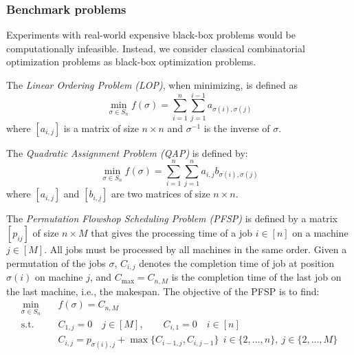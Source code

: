 \documentclass[sigconf,dvipsnames]{acmart}
\begin{document}
\subsubsection{Benchmark problems}
%
Experiments with real-world expensive black-box problems would be computationally infeasible. Instead, we consider classical combinatorial optimization problems as black-box optimization problems. 

The \emph{Linear Ordering Problem (LOP)}, when minimizing, is defined as
\begin{equation}\label{eq:lop}
  \min_{\sigma \in S_n} f(\sigma) = \sum_{i=1}^{n} \sum_{j=1}^{i-1}  a_{\sigma(i), \sigma(j)}
\end{equation}
where $[a_{i,j}]$ is a matrix of size $n \times n$ and $\sigma^{-1}$ is the inverse of $\sigma$.


The \emph{Quadratic Assignment Problem (QAP)} is defined by:
\begin{equation}\label{eq:qap}
  \min_{\sigma \in S_n} f(\sigma) = \sum_{i=1}^n \sum_{j=1}^n a_{i,j} b_{\sigma(i), \sigma(j)}
\end{equation}
%
where $[a_{i,j}]$ and $[b_{i,j}]$ are two matrices of size $n \times n$.

The \emph{Permutation Flowshop Scheduling Problem (PFSP)} is defined by a matrix $[p_{ij}]$ of size $n \times M$ that gives the processing time of a job $i \in [n]$ on a machine $j \in [M]$. All jobs must be processed by all machines in the same order. Given a permutation of the jobs $\sigma$, $C_{i,j}$ denotes the completion time of job at position $\sigma(i)$ on machine $j$, and $C_{\max} = C_{n,M}$  is the completion time of the last job on the last machine, i.e., the makespan. The objective of the PFSP is to find:
\begin{equation}\label{eq:pfsp}
  \begin{split}
    \min_{\sigma \in S_n}\quad& f(\sigma) = C_{n,M}\\
    \text{s.t.}\quad & C_{1,j} = 0 \quad j\in [M], \qquad C_{i,1} = 0\quad i \in [n]\\
    &C_{i,j} = p_{\sigma(i),j} + \max\{C_{i-1, j}, C_{i, j-1}\}  \ \  i \in \{2,\dotsc,n\},\ j \in\{2,\dotsc, M\}\\
\end{split}
\end{equation}
\end{document}
